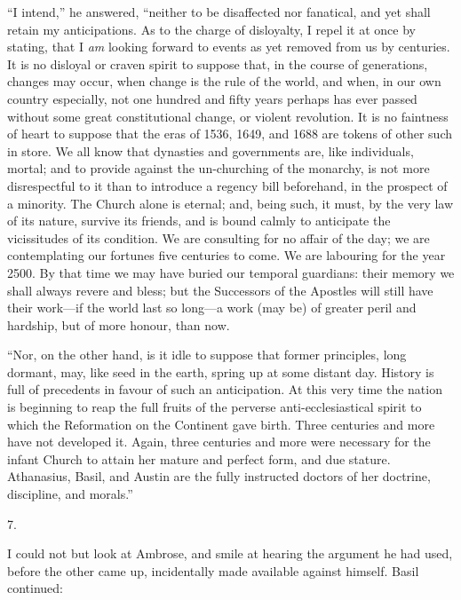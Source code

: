 ``I intend,'' he answered, ``neither to be
disaffected nor fanatical, and yet shall retain my anticipations. As
to the charge of disloyalty, I repel it at once by stating, that I \emph{am}
looking forward to events as yet removed from us by centuries. It is
no disloyal or craven spirit to suppose that, in the course of
generations, changes may occur, when change is the rule of the world,
and when, in our own country especially, not one hundred and fifty
years perhaps has ever passed without some great constitutional
change, or violent revolution. It is no faintness of heart to suppose
that the eras of 1536, 1649, and 1688 are tokens of other such in
store. We all know that dynasties and governments are, like
individuals, mortal; and to provide against the un-churching of the
monarchy, is not more disrespectful to it than to introduce a regency
bill beforehand, in the prospect of a minority. The Church alone is
eternal; and, being such, it must, by the very law of its nature,
survive its friends, and is bound calmly to anticipate the
vicissitudes of its condition. We are consulting for no affair of the
day; we are contemplating our fortunes five centuries to come. We are
labouring for the year 2500. By that time we may have buried our
temporal guardians: their memory we shall always revere and bless; but
the Successors of the Apostles will still have their work—if the
world last so long—a work (may be) of greater peril and hardship,
but of more honour, than now.

``Nor, on the other hand, is it idle to suppose
that former principles, long dormant, may, like seed in the earth,
spring up at some distant day. History is full of precedents in favour
of such an anticipation. At this very time the nation is beginning to
reap the full fruits of the perverse anti-ecclesiastical spirit to
which the Reformation on the Continent gave birth. Three centuries and
more have not developed it. Again, three centuries and more were
necessary for the infant Church to attain her mature and perfect form,
and due stature. Athanasius, Basil, and Austin are the fully
instructed doctors of her doctrine, discipline, and morals.''

7.

I could not but look at Ambrose, and smile at
hearing the argument he had used, before the other came up,
incidentally made available against himself. Basil continued:

